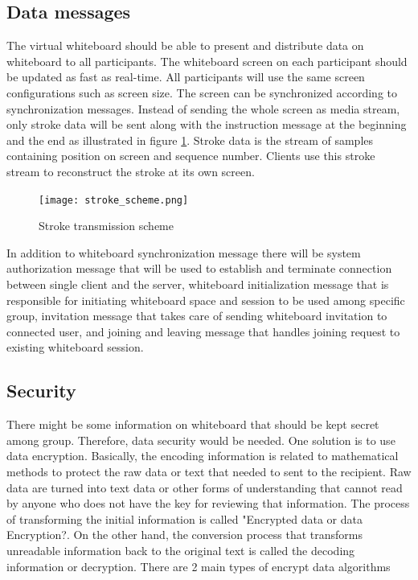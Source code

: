 \documentclass[conference]{IEEEtran}
\begin{document}
\subsection{Data messages}
The virtual whiteboard should be able to present and distribute data on whiteboard to all participants. The whiteboard screen on each participant should be updated as fast as real-time. All participants will use the same screen configurations such as screen size. The screen can be synchronized according to synchronization messages. Instead of sending the whole screen as media stream, only stroke data will be sent along with the instruction message at the beginning and the end as illustrated in figure \ref{fig:2}. Stroke data is the stream of samples containing position on screen and sequence number. Clients use this stroke stream to reconstruct the stroke at its own screen. 

\begin{figure}[h]
\begin{center}
\texttt{[image: stroke\_scheme.png]}
\caption{Stroke transmission scheme}
\label{fig:2}
\end{center}
\end{figure}

In addition to whiteboard synchronization message there will be system authorization message that will be used to establish and terminate connection between single client and the server, whiteboard initialization message that is responsible for initiating whiteboard space and session to be used among specific group, invitation message that takes care of sending whiteboard invitation to connected user, and joining and leaving message that handles joining request to existing whiteboard session.
\subsection{Security}
There might be some information on whiteboard that should be kept secret among group. Therefore, data security would be needed. One solution is to use data encryption. Basically, the encoding information is related to mathematical methods to protect the raw data or text that needed to sent to the recipient. Raw data are turned into text data or other forms of understanding that cannot read by anyone who does not have the key for reviewing that information. The process of transforming the initial information is called "Encrypted data or data Encryption?. On the other hand, the conversion process that transforms unreadable information back to the original text is called the decoding information or decryption. There are 2 main types of encrypt data algorithms
\end{document}
